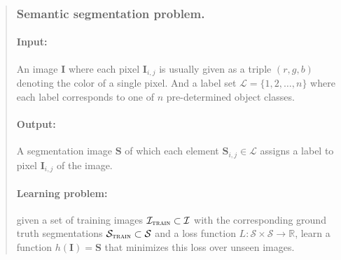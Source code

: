 \documentclass[a4paper,titlepage]{article}
\newcommand{\mat}[1]{\mathbf{#1}}
\begin{document}
\begin{quotation}
\subsubsection*{Semantic segmentation problem.}

\paragraph{Input:} An image $\mat{I}$ where each pixel $\mat{I}_{i,j}$ is usually given as a triple $(r,g,b)$ denoting the color of a single pixel. And a label set $\mathcal{L} = \{1, 2, \ldots, n\}$ where each label corresponds to one of $n$ pre-determined object classes.

\paragraph{Output:} A segmentation image $\mat{S}$ of which each element  $\mat{S}_{i,j} \in \mathcal{L}$ assigns a label to pixel $\mat{I}_{i,j}$ of the image.

\paragraph{Learning problem:} given a set of training images $\mathcal{I}_\textsc{train} \subset \mathcal{I}$ with the corresponding ground truth segmentations $\mathcal{S}_\textsc{train} \subset \mathcal{S}$ and a loss function $L: \mathcal{S} \times \mathcal{S} \rightarrow \mathbb{R}$, learn a function $h(\mat{I}) = \mat{S}$ that minimizes this loss over unseen images. %
\end{quotation}
\end{document}
